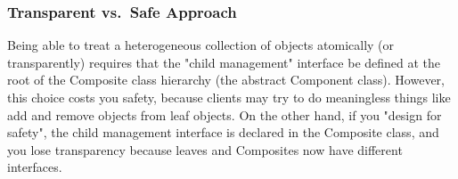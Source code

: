 \subsubsection{Transparent vs.\ Safe Approach}
\begin{sectionbox}[Problem]\nospacing
  Being able to treat a heterogeneous collection of objects atomically (or transparently) requires that the "child management" interface be defined at the root of the Composite class hierarchy (the abstract Component class). However, this choice costs you safety, because clients may try to do meaningless things like add and remove objects from leaf objects. On the other hand, if you "design for safety", the child management interface is declared in the Composite class, and you lose transparency because leaves and Composites now have different interfaces.
\end{sectionbox}


